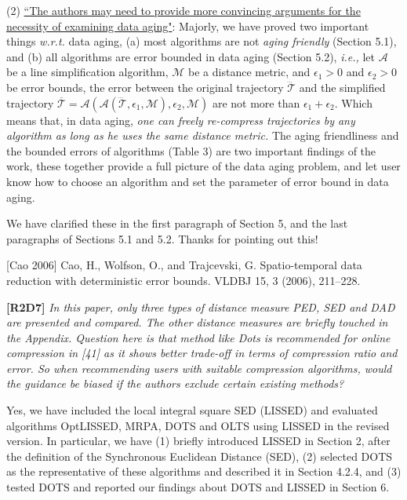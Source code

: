 \documentclass{letter}
\newcommand{\ie}{\emph{i.e.,}\xspace}
\newcommand{\wrt}{\emph{w.r.t.}\xspace}
\begin{document}
{(2) \underline{``The authors may need to provide more convincing arguments for the necessity of examining data aging"}: Majorly, we have proved two important things \wrt data aging, (a) most algorithms are not \emph{aging friendly} (Section 5.1), and (b) all algorithms are error bounded in data aging (Section 5.2), \ie let $\mathcal{A}$ be a line simplification algorithm,  $\mathcal{M}$ be a distance metric, and $\epsilon_1>0$ and $\epsilon_2>0$ be error bounds, the error between the original trajectory $\dddot{\mathcal{T}}$ and the simplified trajectory $\overline{\mathcal{T}}=\mathcal{A}(\mathcal{A}(\dddot{\mathcal{T}}, \epsilon_1, \mathcal{M}), \epsilon_2, \mathcal{M})$ are not more than $\epsilon_1+ \epsilon_2$. Which means that, in data aging, \emph{one can freely re-compress trajectories by any algorithm as long as he uses the same distance metric.} The aging friendliness and the bounded errors of algorithms (Table 3) are two important findings of the work, these together provide a full picture of the data aging problem, and let user know how to choose an algorithm and set the parameter of error bound in data aging. 

We have clarified these in the first paragraph of Section 5, and the last paragraphs of Sections 5.1 and 5.2. Thanks for pointing out this!

[Cao 2006] Cao, H., Wolfson, O., and Trajcevski, G. Spatio-temporal data reduction with deterministic error bounds. VLDBJ 15, 3 (2006), 211–228.


\textbf{[R2D7]} \emph{In this paper, only three types of distance measure PED, SED and DAD are presented and compared. The other distance measures are briefly touched in the Appendix. Question here is that method like Dots is recommended for online compression in [41] as it shows better trade-off in terms of compression ratio and error. So when recommending users with suitable compression algorithms, would the guidance be biased if the authors exclude certain existing methods?}

Yes, we have included the local integral square SED (LISSED) and evaluated algorithms OptLISSED, MRPA, DOTS and OLTS using LISSED in the revised version. In particular, we have (1) briefly introduced LISSED in Section 2, after the definition of the Synchronous Euclidean Distance (SED), (2) selected DOTS as the representative of these algorithms and described it in Section 4.2.4, and (3) tested DOTS and reported our findings about DOTS and LISSED in Section 6.

}
\end{document}
